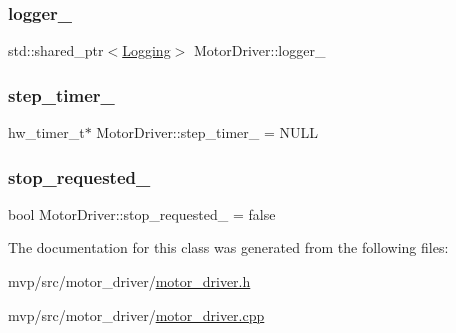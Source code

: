 \mbox{\label{classMotorDriver_a6c443fae635cf2b50bfa205ac4f6418e}} 
\subsubsection{\texorpdfstring{logger\+\_\+}{logger\_}}
{\footnotesize\ttfamily std\+::shared\+\_\+ptr$<$\hyperlink{classLogging}{Logging}$>$ Motor\+Driver\+::logger\+\_\+\hspace{0.3cm}{\ttfamily [private]}}

\mbox{\label{classMotorDriver_a86d3f7015a61c62463ea3e718c5bba1c}} 
\subsubsection{\texorpdfstring{step\+\_\+timer\+\_\+}{step\_timer\_}}
{\footnotesize\ttfamily hw\+\_\+timer\+\_\+t$\ast$ Motor\+Driver\+::step\+\_\+timer\+\_\+ = N\+U\+LL\hspace{0.3cm}{\ttfamily [private]}}

\mbox{\label{classMotorDriver_a6c190777a6bcad1ea12f73707ed67de9}} 
\subsubsection{\texorpdfstring{stop\+\_\+requested\+\_\+}{stop\_requested\_}}
{\footnotesize\ttfamily bool Motor\+Driver\+::stop\+\_\+requested\+\_\+ = false\hspace{0.3cm}{\ttfamily [private]}}



The documentation for this class was generated from the following files\+:\begin{DoxyCompactItemize}
\item 
mvp/src/motor\+\_\+driver/\hyperlink{motor__driver_8h}{motor\+\_\+driver.\+h}\item 
mvp/src/motor\+\_\+driver/\hyperlink{motor__driver_8cpp}{motor\+\_\+driver.\+cpp}\end{DoxyCompactItemize}
